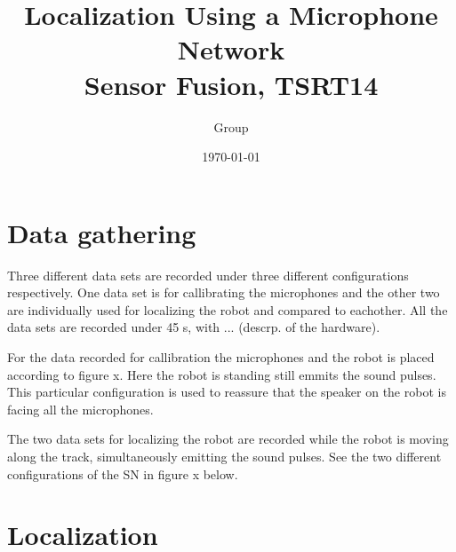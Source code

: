 \documentclass[10pt,a4paper]{report}
\title{Localization Using a Microphone Network\\
Sensor Fusion, TSRT14}
\author{Group}
\date{\today}
\begin{document}
\maketitle


\tableofcontents
\thispagestyle{empty}
\listoffigures
\thispagestyle{empty}
\newpage
\printacronyms
\thispagestyle{empty}
\newpage 
\setcounter{page}{1}


\section{Data gathering}
Three different data sets are recorded under three different configurations respectively. One data set is for callibrating the microphones and the other two are individually used for localizing the robot and compared to eachother. All the data sets are recorded under 45 s, with ... (descrp. of the hardware).

For the data recorded for callibration the microphones and the robot is placed according to figure x. Here the robot is standing still emmits the sound pulses. This particular configuration is used to reassure that the speaker on the robot is facing all the microphones.

The two data sets for localizing the robot are recorded while the robot is moving along the track, simultaneously emitting the sound pulses. See the two different configurations of the SN in figure x below.

\section{Localization}
\end{document}
